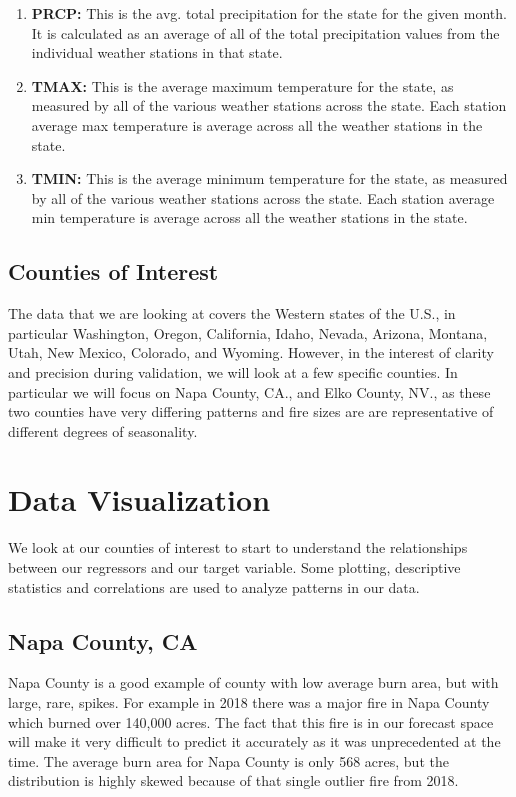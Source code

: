 \documentclass[12pt]{article}
\begin{document}
\begin{enumerate}
\item \textbf{PRCP:} This is the avg. total precipitation for the state for the given month. It is calculated as an average of all of the total precipitation values from the individual weather stations in that state. 

\item \textbf{TMAX:} This is the average maximum temperature for the state, as measured by all of the various weather stations across the state. Each station average max temperature is average across all the weather stations in the state. 

\item \textbf{TMIN:} This is the average minimum temperature for the state, as measured by all of the various weather stations across the state. Each station average min temperature is average across all the weather stations in the state. 

\end{enumerate}

\subsection{\textrm{Counties of Interest}}

The data that we are looking at covers the Western states of the U.S., in particular Washington, Oregon, California, Idaho, Nevada, Arizona, Montana, Utah, New Mexico, Colorado, and Wyoming. However, in the interest of clarity and precision during validation, we will look at a few specific counties. In particular we will focus on Napa County, CA., and Elko County, NV., as these two counties have very differing patterns and fire sizes are are representative of different degrees of seasonality. 

\section{\textrm{Data Visualization}}

We look at our counties of interest to start to understand the relationships between our regressors and our target variable. Some plotting, descriptive statistics and correlations are used to analyze patterns in our data. 

\subsection{\textrm{Napa County, CA}}

Napa County is a good example of county with low average burn area, but with large, rare, spikes. For example in 2018 there was a major fire in Napa County which burned over 140,000 acres. The fact that this fire is in our forecast space will make it very difficult to predict it accurately as it was unprecedented at the time. The average burn area for Napa County is only 568 acres, but the distribution is highly skewed because of that single outlier fire from 2018. \\[0.1in]
\end{document}
